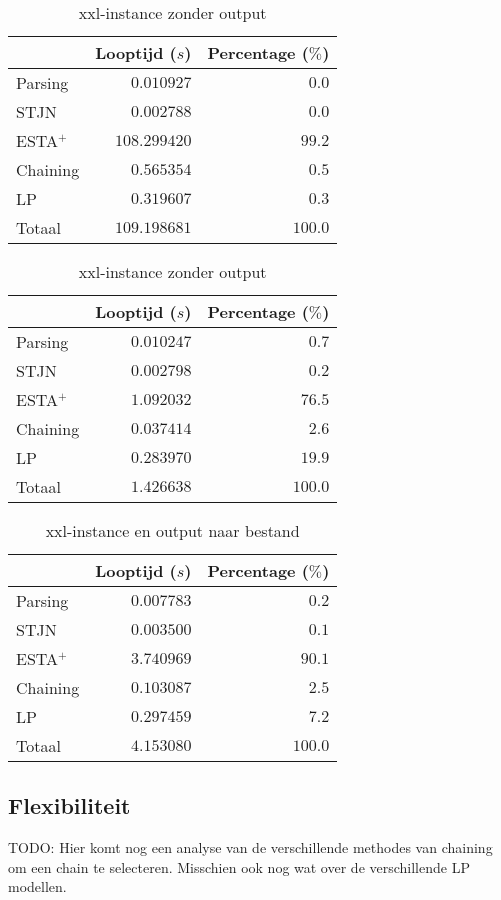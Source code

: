 \begin{table}[H]
\parbox{.45\linewidth}{
    \centering
    \begin{tabular}{| l | r | r |}
        \hline
                    & Looptijd ($s$)  & Percentage ($\%$) \\
        \hline
        Parsing     & $0.010927$      & $0.0$   \\
        STJN        & $0.002788$      & $0.0$   \\
        ESTA$^+$    & $108.299420$    & $99.2$  \\
        Chaining    & $0.565354$      & $0.5$   \\
        LP          & $0.319607$      & $0.3$   \\
        \hline \hline
        Totaal      & $109.198681$    & $100.0$ \\
        \hline
    \end{tabular}
    \caption{xxl-instance met output}
    \label{tbl:xxl+output}
}
\hfill
\parbox{.45\linewidth}{
    \centering
    \begin{tabular}{| l | r | r |}
        \hline
                    & Looptijd ($s$)& Percentage ($\%$) \\
        \hline
        Parsing     & $0.010247$      & $0.7$   \\
        STJN        & $0.002798$      & $0.2$   \\
        ESTA$^+$    & $1.092032$      & $76.5$  \\
        Chaining    & $0.037414$      & $2.6$   \\
        LP          & $0.283970$      & $19.9$  \\
        \hline \hline
        Totaal      & $1.426638$      & $100.0$ \\
        \hline
    \end{tabular}
    \caption{xxl-instance zonder output}
    \label{tbl:xxl-output}
}
\end{table}

\begin{table}[H]
    \centering
    \begin{tabular}{| l | r | r|}
        \hline
                    & Looptijd ($s$)& Percentage ($\%$) \\
        \hline
        
        Parsing     & $0.007783$    & $0.2$     \\
        STJN        & $0.003500$    & $0.1$     \\
        ESTA$^+$    & $3.740969$    & $90.1$    \\
        Chaining    & $0.103087$    & $2.5$     \\
        LP          & $0.297459$    & $7.2$     \\
        \hline \hline
        Totaal      & $4.153080$    & $100.0$   \\
        \hline
    \end{tabular}
    \caption{xxl-instance en output naar bestand}
    \label{tbl:xxl+outputbestand}
\end{table}

\subsection{Flexibiliteit}
TODO: Hier komt nog een analyse van de verschillende methodes van chaining om een chain te selecteren. Misschien ook nog wat over de verschillende LP modellen.

